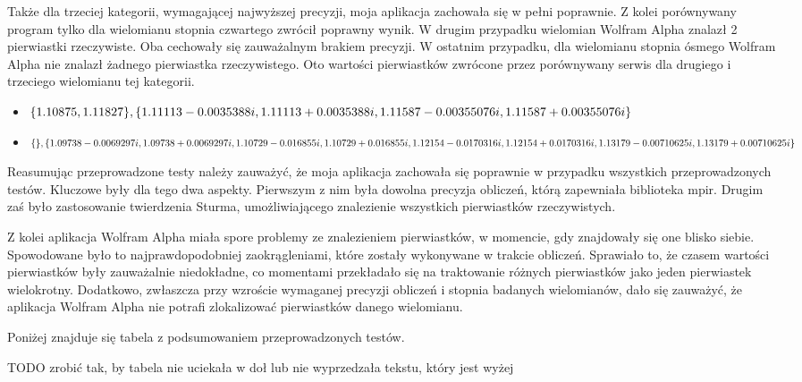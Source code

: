 Także dla trzeciej kategorii, wymagającej najwyższej precyzji, moja aplikacja zachowała się w pełni poprawnie. Z kolei porównywany program tylko dla wielomianu stopnia czwartego zwrócił poprawny wynik. W drugim przypadku wielomian Wolfram Alpha znalazł 2 pierwiastki rzeczywiste. Oba cechowały się zauważalnym brakiem precyzji. W ostatnim przypadku, dla wielomianu stopnia ósmego Wolfram Alpha nie znalazł żadnego pierwiastka rzeczywistego. Oto wartości pierwiastków zwrócone przez porównywany serwis dla drugiego i trzeciego wielomianu tej kategorii.

\begin{itemize}
	\item $\{1.10875, 1.11827\}, \{1.11113-0.0035388i,1.11113+0.0035388i, \\
	1.11587-0.00355076i, 1.11587+0.00355076i\}$
	\item $\{\}, \{1.09738-0.0069297i,1.09738+0.0069297i, 1.10729-0.016855i, \\
	1.10729+0.016855i, 1.12154-0.0170316i, 1.12154+0.0170316i, 1.13179-0.00710625i, \\ 1.13179+0.00710625i\}$
\end{itemize}	

Reasumując przeprowadzone testy należy zauważyć, że moja aplikacja zachowała się poprawnie w przypadku wszystkich przeprowadzonych testów. Kluczowe były dla tego dwa aspekty. Pierwszym z nim była dowolna precyzja obliczeń, którą zapewniała biblioteka mpir. Drugim zaś było zastosowanie twierdzenia Sturma, umożliwiającego znalezienie wszystkich pierwiastków rzeczywistych.

Z kolei aplikacja Wolfram Alpha miała spore problemy ze znalezieniem pierwiastków, w momencie, gdy znajdowały się one blisko siebie. Spowodowane było to najprawdopodobniej zaokrągleniami, które zostały wykonywane w trakcie obliczeń. Sprawiało to, że czasem wartości pierwiastków były zauważalnie niedokładne, co momentami przekładało się na traktowanie różnych pierwiastków jako jeden pierwiastek wielokrotny. Dodatkowo, zwłaszcza przy wzroście wymaganej precyzji obliczeń i stopnia badanych wielomianów, dało się zauważyć, że aplikacja Wolfram Alpha nie potrafi zlokalizować pierwiastków danego wielomianu.

Poniżej znajduje się tabela z podsumowaniem przeprowadzonych testów.

\newpage
TODO zrobić tak, by tabela nie uciekała w doł lub nie wyprzedzała tekstu, który jest wyżej

